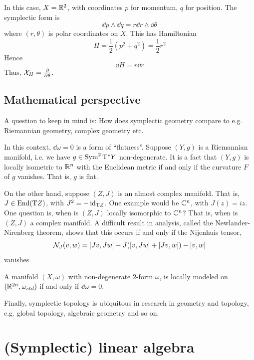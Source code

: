 \documentclass{article}
\begin{document}
\begin{example}
     In this case, \(X = \mathbb{R}^2\), with coordinates \(p\) for momentum, \(q\) for position. The symplectic form is
    \[\dd p \wedge \dd q = r \dd r \wedge \dd\theta\]
    where \((r, \theta)\) is polar coordinates on \(X\).
    This has Hamiltonian
    \[H = \frac{1}{2}(p^2 + q^2) = \frac{1}{2}r^2\]
    Hence
    \[\dd H = r \dd r\]
    Thus, \(\mathcal{X}_H = \pdv{\theta}\).
\end{example}

\subsection{Mathematical perspective}

A question to keep in mind is: How does symplectic geometry compare to e.g. Riemannian geometry, complex geometry etc.

In this context, \(\dd\omega = 0\) is a form of ``flatness''. Suppose \((Y, g)\) is a Riemannian manifold, i.e. we have \(g \in \operatorname{Sym}^2\mathrm{T}^* Y\) non-degenerate. It is a fact that \((Y, g)\) is locally isometric to \(\mathbb{R}^n\) with the Euclidean metric if and only if the curvature \(F\) of \(g\) vanishes. That is, \(g\) is flat. 

On the other hand, suppose \((Z, J)\) is an almost complex manifold. That is, \(J \in \operatorname{End}(\mathrm{T} Z)\), with \(J^2 = - \operatorname{id}_{\mathrm{T} Z}\). One example would be \(\mathbb{C}^n\), with \(J(z) = iz\). One question is, when is \((Z, J)\) locally isomorphic to \(\mathbb{C}^n\)? That is, when is \((Z, J)\) a complex manifold. A difficult result in analysis, called the Newlander-Nirenberg theorem, shows that this occurs if and only if the Nijenhuis tensor,
\[\mathcal{N}_J(v, w) = [Jv, Jw] - J([v, Jw] + [Jv, w]) - [v, w]\]
vanishes

\begin{theorem}
    [Darboux] A manifold \((X, \omega)\) with non-degenerate \(2\)-form \(\omega\), is locally modeled on \((\mathbb{R}^{2n}, \omega_{std})\) if and only if \(\dd\omega = 0\).
\end{theorem}

Finally, symplectic topology is ubiquitous in research in geometry and topology, e.g. global topology, algebraic geometry and so on.

\lec

\section{(Symplectic) linear algebra}
\end{document}
